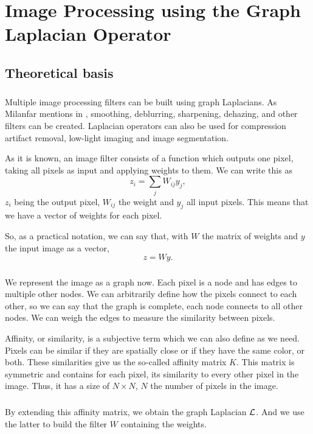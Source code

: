 \chapter{Image Processing using the Graph Laplacian Operator}

\section{Theoretical basis}

\paragraph{}
Multiple image processing filters can be built using graph Laplacians.
As Milanfar mentions in \cite{siam_slides_2016}, smoothing, deblurring, sharpening, dehazing, and other filters can be created.
Laplacian operators can also be used for compression artifact removal, low-light imaging and image segmentation.

As it is known, an image filter consists of a function which outputs one pixel, taking all pixels as input and applying weights to them. We can write this as
\[z_i = \sum_j W_{ij}y_j,\]
\(z_i\) being the output pixel, \(W_{ij}\) the weight and \(y_j\) all input pixels.
This means that we have a vector of weights for each pixel.

So, as a practical notation, we can say that, with \(W\) the matrix of weights and \(y\) the input image as a vector,
\[z = Wy.\]

\paragraph{}
We represent the image as a graph now.
Each pixel is a node and has edges to multiple other nodes.
We can arbitrarily define how the pixels connect to each other, so we can say that the graph is complete, each node connects to all other nodes.
We can weigh the edges to measure the similarity between pixels.

Affinity, or similarity, is a subjective term which we can also define as we need.
Pixels can be similar if they are spatially close or if they have the same color, or both.
These similarities give us the so-called affinity matrix \(K\).
This matrix is symmetric and contains for each pixel, its similarity to every other pixel in the image.
Thus, it has a size of \(N \times N\), \(N\) the number of pixels in the image.

\paragraph{}
By extending this affinity matrix, we obtain the graph Laplacian \(\operatorname{\mathcal{L}}\).
And we use the latter to build the filter \(W\) containing the weights.

